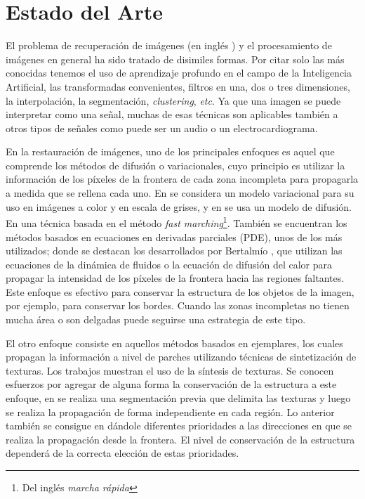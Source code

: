 \section*{Estado del Arte}

El problema de recuperaci\'on de im\'agenes (en ingl\'es \II) y el procesamiento de imágenes en general ha sido tratado de disimiles formas. Por citar solo las m\'as conocidas tenemos el uso de aprendizaje profundo en el campo de la Inteligencia Artificial, las transformadas convenientes, filtros en una, dos o tres dimensiones, la interpolaci\'on, la segmentaci\'on, \textit{clustering}, \textit{etc}. Ya que una imagen se puede interpretar como una señal, muchas de esas t\'ecnicas son aplicables tambi\'en a otros tipos de señales como puede ser un audio o un electrocardiograma.

En la restauraci\'on de im\'agenes, uno de los principales enfoques es aquel que comprende los m\'etodos de difusión o variacionales, cuyo principio es utilizar la informaci\'on de los p\'ixeles de la frontera de cada zona incompleta para propagarla a medida que se rellena cada uno. En \cite{ballester2001variational} se considera un modelo variacional para su uso en im\'agenes a color y en escala de grises, y en \cite{chan2001nontexture} se usa un modelo de difusión. En \cite{telea2004image} una t\'ecnica basada en el m\'etodo \textit{fast marching}\footnote{Del ingl\'es \textit{marcha r\'apida}}. También se encuentran los métodos basados en ecuaciones en derivadas parciales (PDE), unos de los m\'as utilizados; donde se destacan los desarrollados por Bertalmío \cite{bertalmio2001navier,bertalmio2000image}, que utilizan las ecuaciones de la dinámica de fluidos o la ecuación de difusión del calor para propagar la intensidad de los píxeles de la frontera hacia las regiones faltantes. Este enfoque es efectivo para conservar la estructura de los objetos de la imagen, por ejemplo, para conservar los bordes. Cuando las zonas incompletas no tienen mucha área o son delgadas puede seguirse una estrategia de este tipo.

El otro enfoque consiste en aquellos m\'etodos basados en ejemplares, los cuales propagan la informaci\'on a nivel de parches utilizando t\'ecnicas de sintetizaci\'on de texturas. Los trabajos \cite{ashikhmin2001synthesizing,garber1981computational,liang2001real} muestran el uso de la s\'intesis de texturas. Se conocen esfuerzos por agregar de alguna forma la conservaci\'on de la estructura a este enfoque, en \cite{li2014image} se realiza una segmentaci\'on previa que delimita las texturas y luego se realiza la propagaci\'on de forma independiente en cada regi\'on. Lo anterior tambi\'en se consigue en \cite{criminisi2003object, wang2011image} d\'andole diferentes prioridades a las direcciones en que se realiza la propagaci\'on desde la frontera. El nivel de conservaci\'on de la estructura depender\'a de la correcta elecci\'on de estas prioridades.

